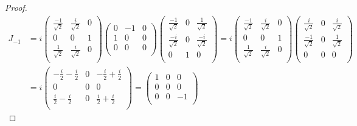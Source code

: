 \documentclass[letterpaper]{article}
\theoremstyle{definition}
\begin{document}
\begin{proof}
  \begin{align*}
    J_{-1} & =i\begin{pmatrix}
      \frac{-1}{\sqrt{2}} & \frac{i}{\sqrt{2}} & 0 \\
      0                   & 0                  & 1 \\
      \frac{1}{\sqrt{2}}  & \frac{i}{\sqrt{2}} & 0 \\
    \end{pmatrix}\begin{pmatrix}
      0 & -1 & 0 \\
      1 & 0  & 0 \\
      0 & 0  & 0 \\
    \end{pmatrix}\begin{pmatrix}
      \frac{-1}{\sqrt{2}} & 0 & \frac{1}{\sqrt{2}}  \\
      \frac{-i}{\sqrt{2}} & 0 & \frac{-i}{\sqrt{2}} \\
      0                   & 1 & 0                   \\
    \end{pmatrix}=i\begin{pmatrix}
      \frac{-1}{\sqrt{2}} & \frac{i}{\sqrt{2}} & 0 \\
      0                   & 0                  & 1 \\
      \frac{1}{\sqrt{2}}  & \frac{i}{\sqrt{2}} & 0 \\
    \end{pmatrix}\begin{pmatrix}
      \frac{i}{\sqrt{2}}  & 0 & \frac{i}{\sqrt{2}} \\
      \frac{-1}{\sqrt{2}} & 0 & \frac{1}{\sqrt{2}} \\
      0                   & 0 & 0                  \\
    \end{pmatrix} \\
           & =i\begin{pmatrix}
      -\frac{i}{2}-\frac{i}{2} & 0 & -\frac{i}{2}+\frac{i}{2} \\
      0                        & 0 & 0                        \\
      \frac{i}{2}-\frac{i}{2}  & 0 & \frac{i}{2}+\frac{i}{2}  \\
    \end{pmatrix}=\begin{pmatrix}
      1 & 0 & 0  \\
      0 & 0 & 0  \\
      0 & 0 & -1 \\
    \end{pmatrix}
  \end{align*}
\end{proof}
\end{document}
